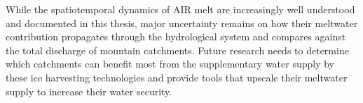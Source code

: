 While the spatiotemporal dynamics of AIR melt are increasingly well understood and documented in this thesis,
major uncertainty remains on how their meltwater contribution propagates through the hydrological system and
compares against the total discharge of mountain catchments. Future research needs to determine which catchments
can benefit most from the supplementary water supply by these ice harvesting technologies and provide tools that
upscale their meltwater supply to increase their water security.

